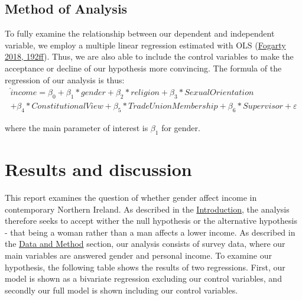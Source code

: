 \documentclass[
]{article}
\begin{document}
\hypertarget{method-of-analysis}{%
\subsection{Method of Analysis}\label{method-of-analysis}}

To fully examine the relationship between our dependent and independent
variable, we employ a multiple linear regression estimated with OLS
(\protect\hyperlink{ref-fogarty2018quantitative}{Fogarty 2018, 192ff}).
Thus, we are also able to include the control variables to make the
acceptance or decline of our hypothesis more convincing. The formula of
the regression of our analysis is thus: \begin{align*}
\hat income = \beta_0 + \beta_1*gender + \beta_2 * religion + \beta_3 * Sexual Orientation \\ + \beta_4 * Constitutional View +  \beta_5*Trade Union Membership + \beta_6*Supervisor + \varepsilon
\end{align*}

where the main parameter of interest is \(\beta_1\) for gender.

\hypertarget{results-and-discussion}{%
\section{Results and discussion}\label{results-and-discussion}}

This report examines the question of whether gender affect income in
contemporary Northern Ireland. As described in the
\protect\hyperlink{introduction}{Introduction}, the analysis therefore
seeks to accept wither the null hypothesis or the alternative hypothesis
- that being a woman rather than a man affects a lower income. As
described in the \protect\hyperlink{data-and-method}{Data and Method}
section, our analysis consists of survey data, where our main variables
are answered gender and personal income. To examine our hypothesis, the
following table shows the results of two regressions. First, our model
is shown as a bivariate regression excluding our control variables, and
secondly our full model is shown including our control variables.
\end{document}
